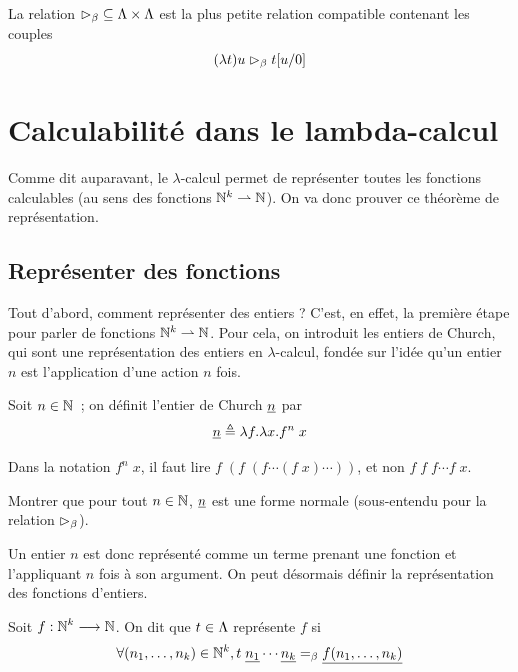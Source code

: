 \begin{definition}
  La relation $\mathord{\mathrel{\rhd_{\beta}}} \subseteq \Lambda\times\Lambda$ est la plus
  petite relation compatible contenant les couples
  \[(\lambda t)u\mathrel{\rhd_{\beta}} t[u/0]\]
\end{definition}

\section{Calculabilité dans le lambda-calcul}

Comme dit auparavant, le $\lambda$-calcul permet de représenter toutes les
fonctions calculables (au sens des fonctions $\mathbb N^k \rightharpoonup \mathbb N$). On va
donc prouver ce théorème de représentation.

\subsection{Représenter des fonctions}

Tout d'abord, comment représenter des entiers ? C'est, en effet, la première
étape pour parler de fonctions $\mathbb N^k\rightharpoonup\mathbb N$. Pour cela, on introduit
les entiers de Church, qui sont une représentation des entiers en
$\lambda$-calcul, fondée sur l'idée qu'un entier $n$ est l'application d'une
action $n$ fois.

\begin{definition}
  Soit $n\in\mathbb N$~; on définit l'entier de Church $\underline{n}$ par
  \[\underline{n} \triangleq \lambda f.\lambda x.f^n\;x\]
\end{definition}

\begin{remark}
  Dans la notation $f^n\;x$, il faut lire $f\;(f\;(f\cdots(f\;x)\cdots))$, et
  non $f\;f\;f\cdots f\;x$.
\end{remark}

\begin{exercise}
  Montrer que pour tout $n \in \mathbb N$, $\underline{n}$ est une forme normale
  (sous-entendu pour la relation $\mathrel{\rhd_{\beta}}$).
\end{exercise}

Un entier $n$ est donc représenté comme un terme prenant une fonction et
l'appliquant $n$ fois à son argument. On peut désormais définir la
représentation des fonctions d'entiers.

\begin{definition}
  Soit $f : \displaystyle \mathbb N^k \longrightarrow \mathbb N$. On dit que $t \in \Lambda$
  représente $f$ si
  \[\forall (n_1,\ldots,n_k) \in \mathbb N^k,
  t\;\underline{n_1}\cdots\underline{n_k} =_{\beta} \underline{f(n_1,\ldots,n_k)}\]
\end{definition}

